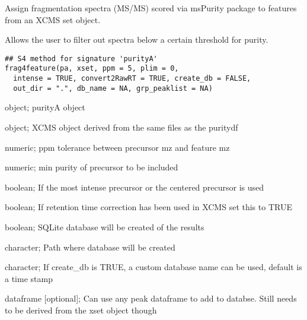 \documentclass[letterpaper]{book}
\begin{document}
%
\begin{Description}\relax
Assign fragmentation spectra (MS/MS) scored via msPurity package to features
from an XCMS set object.

Allows the user to filter out spectra below a certain threshold for purity.
\end{Description}
%
\begin{Usage}
\begin{verbatim}
## S4 method for signature 'purityA'
frag4feature(pa, xset, ppm = 5, plim = 0,
  intense = TRUE, convert2RawRT = TRUE, create_db = FALSE,
  out_dir = ".", db_name = NA, grp_peaklist = NA)
\end{verbatim}
\end{Usage}
%
\begin{Arguments}
\begin{ldescription}
\item[\code{pa}] object; purityA object

\item[\code{xset}] object; XCMS object derived from the same files as the puritydf

\item[\code{ppm}] numeric; ppm tolerance between precursor mz and feature mz

\item[\code{plim}] numeric; min purity of precursor to be included

\item[\code{intense}] boolean; If the most intense precursor or the centered precursor is used

\item[\code{convert2RawRT}] boolean; If retention time correction has been used in XCMS set this to TRUE

\item[\code{create\_db}] boolean; SQLite database will be created of the results

\item[\code{out\_dir}] character; Path where database will be created

\item[\code{db\_name}] character; If create\_db is TRUE, a custom database name can be used, default is a time stamp

\item[\code{grp\_peaklist}] dataframe [optional]; Can use any peak dataframe to add to databse. Still needs to be derived from the xset object though
\end{ldescription}
\end{Arguments}
\end{document}
